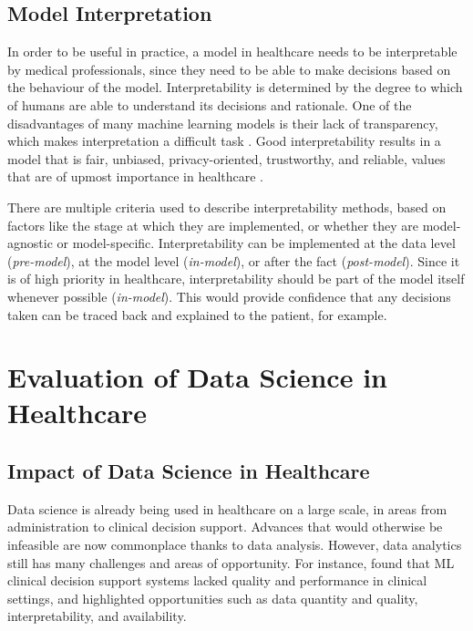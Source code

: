 \documentclass[a4paper,11pt]{article}
\begin{document}
\subsection{Model Interpretation}

In order to be useful in practice, a model in healthcare needs to be interpretable
by medical professionals, since they need to be able to make decisions based on
the behaviour of the model.
Interpretability is determined by the degree to which of humans
are able to understand its decisions and rationale.
One of the disadvantages of many machine learning models is their lack of
transparency, which makes interpretation a difficult task \parencite{Stiglic2020}.
Good interpretability results in a model that is fair, unbiased, privacy-oriented,
trustworthy, and reliable, values that are of upmost importance in healthcare \parencite{DoshiVelez2017}.

There are multiple criteria used to describe interpretability methods, based on
factors like the stage at which they are implemented, or whether they are
model-agnostic or model-specific.
Interpretability can be implemented at the data level (\textit{pre-model}),
at the model level (\textit{in-model}), or after the fact (\textit{post-model}).
Since it is of high priority in healthcare, interpretability should be part of
the model itself whenever possible (\textit{in-model}).
This would provide confidence that any decisions taken can be traced back and
explained to the patient, for example.


\section{Evaluation of Data Science in Healthcare}


\subsection{Impact of Data Science in Healthcare}


Data science is already being used in healthcare on a large scale, in areas from
administration to clinical decision support.
Advances that would otherwise be infeasible are now commonplace thanks to data
analysis.
However, data analytics still has many challenges and areas of opportunity.
For instance, \parencite{PeifferSmadja2020} found that ML clinical decision
support systems lacked quality and performance in clinical settings, and
highlighted opportunities such as data quantity and quality, interpretability,
and availability.
\end{document}
